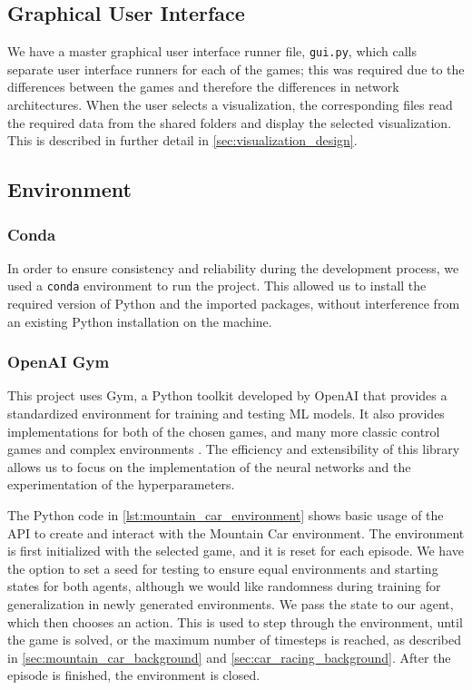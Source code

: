 \subsection{Graphical User Interface}
We have a master graphical user interface runner file, \lstinline{gui.py},
which calls separate user interface runners for each of the games; this was
required due to the differences between the games and therefore the differences
in network architectures. When the user selects a visualization, the
corresponding files read the required data from the shared folders and display
the selected visualization. This is described in further detail in
\autoref{sec:visualization_design}.

\subsection{Environment}

\subsubsection{Conda}
In order to ensure consistency and reliability during the development process,
we used a \lstinline{conda} environment to run the project. This allowed us to
install the required version of Python and the imported packages, without
interference from an existing Python installation on the machine.

\subsubsection{OpenAI Gym} \label{sec:gym_environment}

This project uses Gym, a Python toolkit developed by OpenAI that provides a
standardized environment for training and testing ML models. It also provides
implementations for both of the chosen games, and many more classic control
games and complex environments \cite{brockman2016gym}. The efficiency and
extensibility of this library allows us to focus on the implementation of the
neural networks and the experimentation of the hyperparameters.

The Python code in \autoref{lst:mountain_car_environment} shows basic usage of
the API to create and interact with the Mountain Car environment. The
environment is first initialized with the selected game, and it is reset for
each episode. We have the option to set a seed for testing to ensure equal
environments and starting states for both agents, although we would like
randomness during training for generalization in newly generated environments.
We pass the state to our agent, which then chooses an action. This is used to
step through the environment, until the game is solved, or the maximum number
of timesteps is reached, as described in \autoref{sec:mountain_car_background}
and \autoref{sec:car_racing_background}. After the episode is finished, the
environment is closed.

